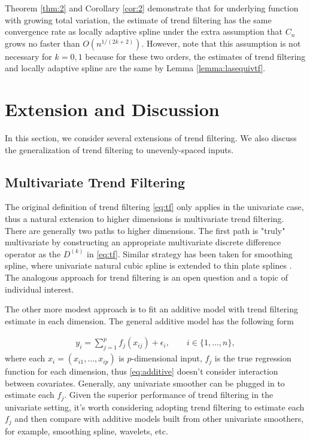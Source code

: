 \documentclass[a4paper]{article}
\begin{document}
Theorem \ref{thm:2} and Corollary \ref{cor:2} demonstrate that for underlying function with growing total variation, the estimate of trend filtering has the same convergence rate as locally adaptive spline under the extra assumption that $C_n$ grows no faster than $O(n^{1/(2k+2)})$. However, note that this assumption is not necessary for $k = 0, 1$ because for these two orders, the estimates of trend filtering and locally adaptive spline are the same by Lemma \ref{lemma:lasequivtf}.

\section{Extension and Discussion}
\label{sec:extension}
In this section, we consider several extensions of trend filtering. We also discuss the generalization of trend filtering to unevenly-spaced inputs. 

\subsection{Multivariate Trend Filtering}
The original definition of trend filtering \eqref{eq:tf} only applies in the univariate case, thus a natural extension to higher dimensions is multivariate trend filtering. There are generally two paths to higher dimensions. The first path is "truly" multivariate by constructing an appropriate multivariate discrete difference operator as the $D^{(k)}$ in \eqref{eq:tf}. Similar strategy has been taken for smoothing spline, where univariate natural cubic spline is extended to thin plate splines \cite{green1993nonparametric,wahba1990spline}. The analogous approach for trend filtering is an open question and a topic of individual interest.

The other more modest approach is to fit an additive model with trend filtering estimate in each dimension. The general additive model \cite{hastie1990generalized} has the following form

\begin{align}
y_i = \sum_{j=1}^pf_j(x_{ij}) + \epsilon_i, \qquad i\in\{1,\ldots, n\},
\label{eq:additive}
\end{align}
where each $x_i=(x_{i1},\ldots, x_{ip})$ is $p$-dimensional input, $f_j$ is the true regression function for each dimension, thus \eqref{eq:additive} doesn't consider interaction between covariates. Generally, any univariate smoother can be plugged in to estimate each $f_j$. Given the superior performance of trend filtering in the univariate setting, it's worth considering adopting trend filtering to estimate each $f_j$ and then compare with additive models built from other univariate smoothers, for example, smoothing spline, wavelets, etc.
\end{document}
